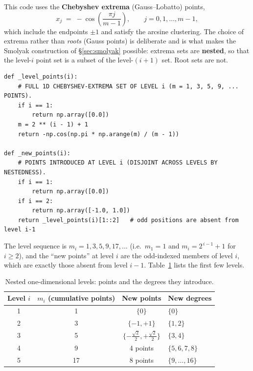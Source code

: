 \documentclass[11pt]{article}
\numberwithin{equation}{section}
\newcommand{\code}[1]{\texttt{\small #1}}
\theoremstyle{definition}
\theoremstyle{plain}
\theoremstyle{remark}
\begin{document}
This code uses the \textbf{Chebyshev extrema} (Gauss--Lobatto) points,
\begin{equation}
x_j\;=\;-\cos\!\left(\frac{\pi j}{m-1}\right),
\qquad j=0,1,\dots,m-1,
\label{eq:cheb-extrema}
\end{equation}
which include the endpoints $\pm1$ and satisfy the arcsine clustering. The choice of
extrema rather than \emph{roots} (Gauss points) is deliberate and is what makes the
Smolyak construction of \S\ref{sec:smolyak} possible: extrema sets are
\textbf{nested}, so that the level-$i$ point set is a subset of the level-$(i{+}1)$
set. Root sets are not.

\begin{lstlisting}[caption={Nested Chebyshev-extrema levels. \code{state\_grid.py}.}]
def _level_points(i):
    # FULL 1D CHEBYSHEV-EXTREMA SET OF LEVEL i (m = 1, 3, 5, 9, ... POINTS).
    if i == 1:
        return np.array([0.0])
    m = 2 ** (i - 1) + 1
    return -np.cos(np.pi * np.arange(m) / (m - 1))

def _new_points(i):
    # POINTS INTRODUCED AT LEVEL i (DISJOINT ACROSS LEVELS BY NESTEDNESS).
    if i == 1:
        return np.array([0.0])
    if i == 2:
        return np.array([-1.0, 1.0])
    return _level_points(i)[1::2]   # odd positions are absent from level i-1
\end{lstlisting}

The level sequence is $m_i=1,3,5,9,17,\dots$ (i.e.\ $m_1=1$ and
$m_i=2^{\,i-1}+1$ for $i\ge2$), and the ``new points'' at level $i$ are the
odd-indexed members of level $i$, which are exactly those absent from level $i-1$.
Table~\ref{tab:levels} lists the first few levels.

\begin{table}[htbp]
\centering\small
\caption{Nested one-dimensional levels: points and the degrees they introduce.}
\label{tab:levels}
\begin{tabular}{@{}cccl@{}}
\toprule
Level $i$ & $m_i$ (cumulative points) & New points & New degrees \\
\midrule
1 & 1 & $\{0\}$                                  & $\{0\}$ \\
2 & 3 & $\{-1,+1\}$                              & $\{1,2\}$ \\
3 & 5 & $\{-\tfrac{\sqrt2}{2},+\tfrac{\sqrt2}{2}\}$ & $\{3,4\}$ \\
4 & 9 & 4 points                                  & $\{5,6,7,8\}$ \\
5 & 17& 8 points                                  & $\{9,\dots,16\}$ \\
\bottomrule
\end{tabular}
\end{table}
\end{document}
